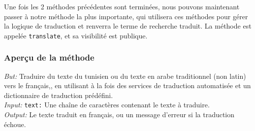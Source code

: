 \newpage
\noindent
Une fois les 2 méthodes précédentes sont terminées, nous pouvons maintenant passer à notre méthode la plus importante, qui utilisera ces méthodes pour gérer la logique de traduction et renverra le terme de recherche traduit. La méthode est appelée \texttt{translate}, et sa visibilité est publique.

\subsubsection{Aperçu de la méthode}
\noindent
\textit{But:} Traduire du texte du tunisien ou du texte en arabe traditionnel (non latin) vers le français,, en utilisant à la fois des services de traduction automatisée et un dictionnaire de traduction prédéfini. \\
\textit{Input:} \texttt{text:} Une chaîne de caractères contenant le texte à traduire. \\
\textit{Output:} Le texte traduit en français, ou un message d'erreur si la traduction échoue.

\newpage
